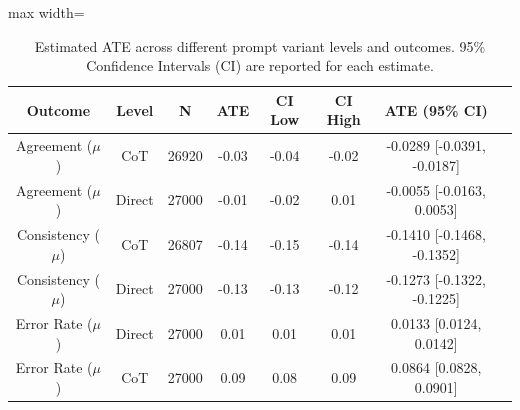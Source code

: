 \documentclass[11pt]{article}
\begin{document}
\begin{table}[htbp]
\centering
\begin{adjustbox}{max width=\textwidth}
\begin{tabular}{cccccccc}
\toprule
Outcome & Level & N & ATE & CI Low & CI High & ATE (95\% CI) \\
\midrule
Agreement ($\mu$)   & CoT      & 26920 & -0.03 & -0.04 & -0.02 & -0.0289 [-0.0391, -0.0187] \\
Agreement ($\mu$)   & Direct & 27000 & -0.01 & -0.02 &  0.01 & -0.0055 [-0.0163, 0.0053] \\
Consistency ($\mu$) & CoT      & 26807 & -0.14 & -0.15 & -0.14 & -0.1410 [-0.1468, -0.1352] \\
Consistency ($\mu$) & Direct & 27000 & -0.13 & -0.13 & -0.12 & -0.1273 [-0.1322, -0.1225] \\
Error Rate ($\mu$)  & Direct & 27000 &  0.01 &  0.01 &  0.01 &  0.0133 [0.0124, 0.0142] \\
Error Rate ($\mu$)  & CoT      & 27000 &  0.09 &  0.08 &  0.09 &  0.0864 [0.0828, 0.0901] \\
\bottomrule
\end{tabular}
\end{adjustbox}
\caption{Estimated ATE across different prompt variant levels and outcomes. 95\% Confidence Intervals (CI) are reported for each estimate.}
\label{tab:ate_prompt_variant}
\end{table}
\end{document}
